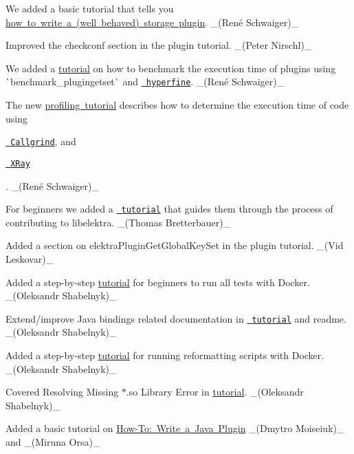 \begin{DoxyItemize}
\item We added a basic tutorial that tells you \mbox{\hyperlink{doc_tutorials_storage-plugins_md}{how to write a (well behaved) storage plugin}}. \+\_\+(René Schwaiger)\+\_\+
\item Improved the {\ttfamily checkconf} section in the plugin tutorial. \+\_\+(\+Peter Nirschl)\+\_\+
\item We added a \mbox{\hyperlink{doc_tutorials_benchmarking_md}{tutorial}} on how to benchmark the execution time of plugins using \`{}benchmark\+\_\+plugingetset\`{} and \href{https://github.com/sharkdp/hyperfine}{\texttt{ hyperfine}}. \+\_\+(René Schwaiger)\+\_\+
\item The new \mbox{\hyperlink{doc_tutorials_profiling_md}{profiling tutorial}} describes how to determine the execution time of code using
\begin{DoxyItemize}
\item \href{http://valgrind.org/docs/manual/cl-manual.html}{\texttt{ Callgrind}}, and
\item \href{https://llvm.org/docs/XRay.html}{\texttt{ X\+Ray}}
\end{DoxyItemize}

. \+\_\+(René Schwaiger)\+\_\+
\item For beginners we added a \href{https://www.libelektra.org/tutorials/contributing-with-clion}{\texttt{ tutorial}} that guides them through the process of contributing to libelektra. \+\_\+(\+Thomas Bretterbauer)\+\_\+
\item Added a section on {\ttfamily elektra\+Plugin\+Get\+Global\+Key\+Set} in the plugin tutorial. \+\_\+(\+Vid Leskovar)\+\_\+
\item Added a step-\/by-\/step \mbox{\hyperlink{doc_tutorials_run_all_tests_with_docker_md}{tutorial}} for beginners to run all tests with Docker. \+\_\+(\+Oleksandr Shabelnyk)\+\_\+
\item Extend/improve Java bindings related documentation in \href{https://www.libelektra.org/tutorials/java-bindings}{\texttt{ tutorial}} and readme. \+\_\+(\+Oleksandr Shabelnyk)\+\_\+
\item Added a step-\/by-\/step \mbox{\hyperlink{doc_tutorials_run_reformatting_script_with_docker_md}{tutorial}} for running reformatting scripts with Docker. \+\_\+(\+Oleksandr Shabelnyk)\+\_\+
\item Covered Resolving Missing $\ast$.so Library Error in \mbox{\hyperlink{doc_tutorials_contributing-clion_md}{tutorial}}. \+\_\+(\+Oleksandr Shabelnyk)\+\_\+
\item Added a basic tutorial on \mbox{\hyperlink{doc_tutorials_java-plugins_md}{How-\/\+To\+: Write a Java Plugin}} \+\_\+(\+Dmytro Moiseiuk)\+\_\+ and \+\_\+(\+Miruna Orsa)\+\_\+
\end{DoxyItemize}


